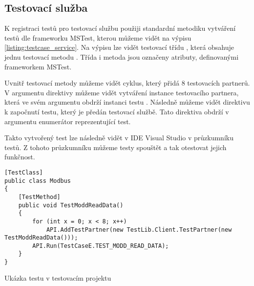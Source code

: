 \subsection{Testovací služba}

K registraci testů pro testovací službu použiji standardní metodiku vytváření testů dle frameworku MSTest, kterou můžeme vidět na výpisu \ref{listing:testcase_service}. Na výpisu lze vidět testovací třídu , která obsahuje jednu testovací metodu . Třída i metoda jsou označeny atributy, definovanými frameworkem MSTest. 

Uvnitř testovací metody můžeme vidět cyklus, který přidá 8 testovacích partnerů. V argumentu direktivy můžeme vidět vytváření instance testovacího partnera, která ve svém argumentu obdrží instanci testu . Následně můžeme vidět direktivu k započnutí testu, který je předán testovací službě. Tato direktiva obdrží v argumentu enumerátor reprezentující test.

Takto vytvořený test lze následně vidět v IDE Visual Studio v průzkumníku testů. Z tohoto průzkumníku můžeme testy spouštět a tak otestovat jejich funkčnost.  

\begin{listing}[htbp]
    \centering
    \begin{verbatim}
[TestClass]
public class Modbus
{
    [TestMethod]
    public void TestModdReadData()
    {
        for (int x = 0; x < 8; x++)
            API.AddTestPartner(new TestLib.Client.TestPartner(new TestModdReadData()));
        API.Run(TestCaseE.TEST_MODD_READ_DATA);
    }
}
    \end{verbatim}
\caption{Ukázka testu v testovacím projektu}
\label{listing:testcase_service}
\end{listing}


